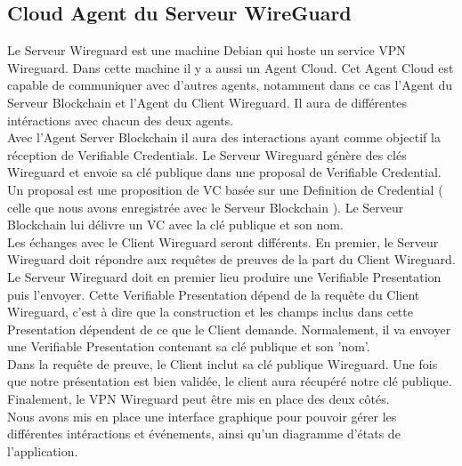 \documentclass[12pt, openany]{report}
\begin{document}
\subsection{Cloud Agent du Serveur WireGuard}
\noindent 
\begin{flushleft}
Le Serveur Wireguard est une machine Debian qui hoste un service VPN Wireguard.  Dans cette machine il y a aussi un Agent Cloud. Cet Agent Cloud est capable de communiquer avec d'autres agents, notamment dans ce cas l'Agent du Serveur Blockchain et l'Agent du Client Wireguard. Il aura de différentes intéractions avec chacun des deux agents. \\
\vspace{2mm}
Avec l'Agent Server Blockchain il aura des interactions ayant comme objectif la réception de Verifiable Credentials. Le Serveur Wireguard génère des clés Wireguard et envoie sa clé publique dans une proposal de Verifiable Credential. Un proposal est une proposition de VC basée sur une Definition de Credential ( celle que nous avons enregistrée avec le Serveur Blockchain ). Le Serveur Blockchain lui délivre un VC avec la clé publique et son nom. \\
\vspace{2mm}
Les échanges avec le Client Wireguard seront différents. En premier, le Serveur Wireguard doit répondre aux requêtes de preuves de la part du Client Wireguard. Le Serveur Wireguard doit en premier lieu produire une Verifiable Presentation puis l'envoyer. Cette Verifiable Presentation dépend de la requête du Client Wireguard, c'est à dire que la construction et les champs inclus dans cette Presentation dépendent de ce que le Client demande. Normalement, il va envoyer une Verifiable Presentation contenant sa clé publique et son 'nom'. \\
Dans la requête de preuve, le Client inclut sa clé publique Wireguard. Une fois que notre présentation est bien validée, le client aura récupéré notre clé publique. Finalement, le VPN Wireguard peut être mis en place des deux côtés. \\

Nous avons mis en place une interface graphique pour pouvoir gérer les différentes intéractions et événements, ainsi qu'un diagramme d'états de l'application.\\


\end{flushleft}
\end{document}
